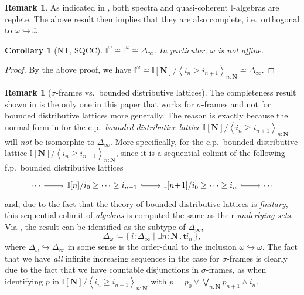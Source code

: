 \documentclass[12pt]{amsart}
\newtheorem{corollary}[theorem]{Corollary}
\theoremstyle{definition}
\newtheorem{remark}[theorem]{Remark}
\newcommand{\mb}[1]{\mathbf{#1}}
\newcommand{\mbb}[1]{\mathbb{#1}}
\newcommand{\I}{\mbb I}
\newcommand{\ms}[1]{\mathsf{#1}}
\newcommand{\ov}[1]{\overline{#1}}
\newcommand{\pair}[1]{\left\langle#1\right\rangle}
\newcommand{\scomp}[2]{\{\,#1\mid#2\,\}}
\newcommand{\hook}{\hookrightarrow}
\newcommand{\N}{\mb N}
\newcommand{\ex}[2]{\exists #1\!\colon\!\!#2\mathpunct{.}}
\begin{document}
\begin{remark}
  As indicated in , both spectra and quasi-coherent $\I$-algebras are replete. The above result then implies that they are also complete, i.e.\ orthogonal to $\omega\hook\ov\omega$.
\end{remark}

\begin{corollary}[NT, SQCC]
  $\I^{\ov\omega} \cong \I^\omega \cong \Delta_\infty$. In particular, $\omega$ is not affine.
\end{corollary}
\begin{proof}
  By the above proof, we have $\I^{\ov\omega} \cong \I[\N]/\pair{i_n \ge i_{n+1}}_{n:\N} \cong \Delta_\infty$.
\end{proof}

\begin{remark}[$\sigma$-frames vs.\ bounded distributive lattices]\label{rem:whynotdis}
  The completeness result shown in  is the only one in this paper that works for $\sigma$-frames and not for bounded distributive lattices more generally. The reason is exactly because the normal form in  for the c.p.\ \emph{bounded distributive lattice} $\I[\N]/\pair{i_n \ge i_{n+1}}_{n:\N}$ will \emph{not} be isomorphic to $\Delta_\infty$. More specifically, for the c.p.\ bounded distributive lattice $\I[\N]/\pair{i_n \ge i_{n+1}}_{n:\N}$, since it is a sequential colimit of the following f.p.\ bounded distributive lattices
  \[ 
  \begin{tikzcd}
    \cdots \ar[r] & \I[n]/i_{0} \ge \cdots \ge i_{n-1} \ar[r, hook] & \I[n\!+\!1]/i_0 \ge \cdots \ge i_n \ar[r, hook] & \cdots
  \end{tikzcd}
  \]
  and, due to the fact that the theory of bounded distributive lattices is \emph{finitary}, this sequential colimit of \emph{algebras} is computed the same as their \emph{underlying sets}. Via , the result can be identified as the subtype of $\Delta_\infty$,
  \[ \Delta_\omega \coloneq \scomp{i : \Delta_\infty}{\ex n\N \ms ti_n}, \]
  where $\Delta_\omega \hook \Delta_\infty$ in some sense is the order-dual to the inclusion $\omega\hook\ov\omega$. The fact that we have \emph{all} infinite increasing sequences in the case for $\sigma$-frames is clearly due to the fact that we have countable disjunctions in $\sigma$-frames, as when identifying $p$ in $\I[\N]/\pair{i_n \ge i_{n+1}}_{n:\N}$ with $p = p_0 \vee \bigvee_{n:\N}p_{n+1}\wedge i_n$.
\end{remark}
\end{document}
